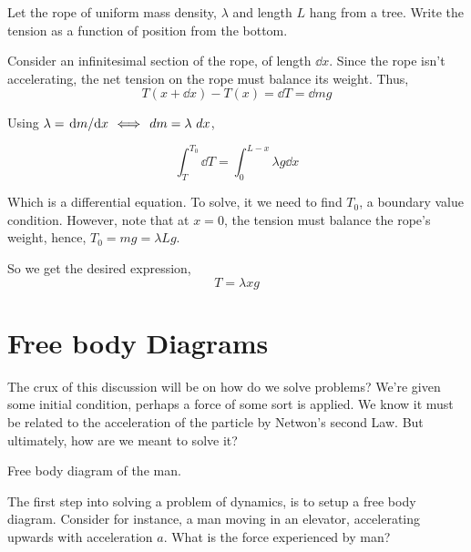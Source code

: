\begin{example}
    Let the rope of uniform mass density, \(\lambda\) and length \(L\) hang from a tree. Write the tension as 
    a function of position from the bottom. 

    \begin{soln}
        Consider an infinitesimal section of the rope, of length \(\dd{x}\). Since 
        the rope isn't accelerating, the net tension on the rope must balance its weight.
        Thus,
        \begin{equation*}
            T(x + \dd{x}) - T(x) = \dd{T} = \dd{m} g
        \end{equation*}

        Using \(\lambda = \dv*{m}{x} \iff \mathop{}{d}{m} = \lambda \mathop{}{d}{x}\),

        \begin{equation*}
            \int_{T}^{T_0} \dd{T} = \int_0^{L-x} \lambda g \dd{x}
        \end{equation*}

        Which is a differential equation. To solve, it we need to find \(T_0\), 
        a boundary value condition. However, note that at \(x = 0\), 
        the tension must balance the rope's weight, hence, \(T_0 = mg = \lambda Lg\).

        So we get the desired expression, \begin{equation*}
            T = \lambda xg
        \end{equation*}
    \end{soln}
\end{example}

\section{Free body Diagrams}

The crux of this discussion will be on how do we solve problems? We're given 
some initial condition, perhaps a force of some sort is applied. We know it must be 
related to the acceleration of the particle by Netwon's second Law. But ultimately, how are 
we meant to solve it?

\begin{marginfigure}
    \caption{Free body diagram of the man.}
\end{marginfigure}

The first step into solving a problem of dynamics, is to setup a free body diagram.
Consider for instance, a man moving in an elevator, accelerating upwards with acceleration 
\(a\). What is the force experienced by man?

